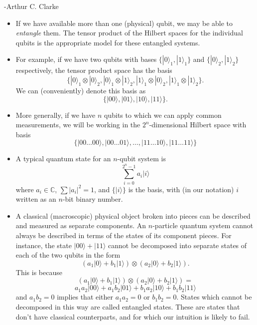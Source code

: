 \documentclass{article}
\def\pagedone{\newpage}
\def\ket#1{|{#1}\rangle}
\def\complex{\mathbb{C}}
\def\tensor{\otimes}
\begin{document}
-Arthur C. Clarke


\pagedone
{}
\begin{itemize}
	\item If we have available more than one (physical) qubit, we may be able to {\em entangle} them.  The tensor product of the Hilbert spaces for the individual qubits is the appropriate model for these entangled systems.

	\item For example, if we have two qubits with bases $\{\ket 0_1,\ket 1_1\}$ and
	$\{ \ket 0_2,\ket 1_2\}$ respectively, the tensor product space has the basis 
	$$\{\ket 0_1\tensor\ket 0_2,\ket 0_1\tensor\ket 1_2,\ket 1_1\tensor\ket 0_2,\ket 1_1\tensor\ket 1_2\}.$$  We can (conveniently) denote this basis as
$$\{\ket{00},\ket{01},\ket{10},\ket{11}\}.$$
\end{itemize}



\pagedone

\begin{itemize}

	\item More generally, if we have $n$ qubits to which we can apply common measurements, we will be working in the $2^n$-dimensional Hilbert space with basis
$$\{\ket{00\ldots00},\ket{00\ldots01},\ldots,\ket{11\ldots10},\ket{11\ldots11}\}$$
\item A typical quantum state for an $n$-qubit system is
$$\sum_{i = 0}^{2^n-1}a_i\ket i$$
where $a_i\in\complex$, $\sum\vert a_i\vert^2=1$, and $\{\ket i\}$ is the basis, with (in our notation) $i$ written as an $n$-bit binary number.

\end{itemize}



\pagedone

\begin{itemize}
\item A classical (macroscopic) physical 
object broken into pieces can be described and measured as separate components.
An $n$-particle quantum system cannot always be
described in terms of the states of its component pieces. For instance, 
the state \newline$\ket{00}+\ket{11}$ cannot be decomposed into separate states
of each of the two qubits in the form
$$(a_1\ket 0 + b_1\ket 1)\tensor (a_2\ket 0 + b_2\ket 1).$$
This is because 
$$(a_1\ket 0 + b_1\ket 1)\tensor (a_2\ket 0 + b_2\ket 1) = $$
$$  a_1a_2\ket{00} + a_1b_2\ket{01} + b_1a_2\ket{10} + b_1b_2\ket{11}$$ and
$a_1b_2 = 0$ implies that either $a_1a_2 = 0$ or $b_1b_2 = 0$.
States which cannot be decomposed in this way are called entangled states.
These are states that don't have classical counterparts, and
for which our intuition is likely to fail.

\end{itemize}
\end{document}
